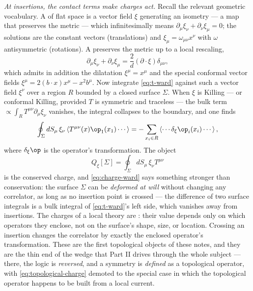 \emph{At insertions, the contact terms make charges act.} Recall the
relevant geometric vocabulary. A  of flat space is a
vector field $\xi$ generating an isometry --- a map that preserves the
metric --- which infinitesimally means $\partial_\mu \xi_\nu + \partial_\nu
\xi_\mu = 0$; the solutions are the constant vectors (translations) and
$\xi_\mu = \omega_{\mu\nu} x^\nu$ with $\omega$ antisymmetric (rotations). A
 preserves the metric up to a local
rescaling,
\begin{equation}
\partial_\mu \xi_\nu + \partial_\nu \xi_\mu
= \frac{2}{d}(\partial\cdot\xi)\delta_{\mu\nu},
\label{eq:ckv}
\end{equation}
which admits in addition the dilatation $\xi^\mu = x^\mu$ and the special
conformal vector fields $\xi^\mu = 2(b\cdot x)x^\mu - x^2 b^\mu$. Now
integrate \eqref{eq:t-ward} against such a vector field $\xi^\nu$ over a
region $R$ bounded by a closed surface $\Sigma$. When $\xi$ is Killing ---
or conformal Killing, provided $T$ is symmetric and traceless --- the bulk
term $\propto \int_R T^{\mu\nu}\partial_\mu \xi_\nu$ vanishes, the integral
collapses to the boundary, and one finds
\begin{equation}
\oint_{\Sigma} dS_\mu\, \xi_\nu \left\langle T^{\mu\nu}(x)
\op_1(x_1)\cdots \right\rangle
= -\sum_{x_i \in R}
\left\langle \cdots \delta_\xi \op_i(x_i) \cdots \right\rangle ,
\label{eq:charge-ward}
\end{equation}
where $\delta_\xi \op$ is the operator's transformation. The object
\begin{equation}
Q_\xi[\Sigma] = \oint_\Sigma dS_\mu\, \xi_\nu T^{\mu\nu}
\label{eq:topological-charge}
\end{equation}
is the conserved charge, and \eqref{eq:charge-ward} says something stronger
than conservation: the surface $\Sigma$ can be \emph{deformed at will} without
changing any correlator, as long as no insertion point is crossed --- the
difference of two surface integrals is a bulk integral of
\eqref{eq:t-ward}'s left side, which vanishes away from insertions. The
charges of a local theory are : their
value depends only on which operators they enclose, not on the surface's
shape, size, or location. Crossing an insertion changes the correlator by
exactly the enclosed operator's transformation. These are the first
topological objects of these notes, and they are the thin end of the wedge
that Part II drives through the whole subject --- there, the logic is
\emph{reversed}, and a symmetry is \emph{defined} as a topological operator,
with \eqref{eq:topological-charge} demoted to the special case in which the
topological operator happens to be built from a local current.

